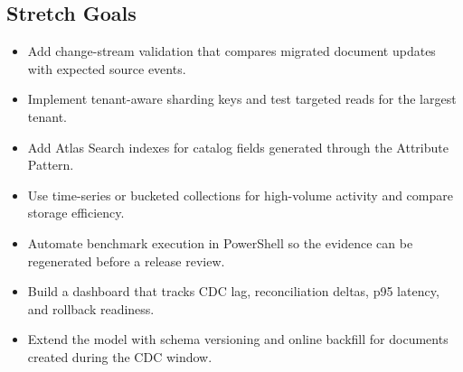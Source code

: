 \subsection*{Stretch Goals}
\begin{itemize}
    \item Add change-stream validation that compares migrated document updates with expected source events.
    \item Implement tenant-aware sharding keys and test targeted reads for the largest tenant.
    \item Add Atlas Search indexes for catalog fields generated through the Attribute Pattern.
    \item Use time-series or bucketed collections for high-volume activity and compare storage efficiency.
    \item Automate benchmark execution in PowerShell so the evidence can be regenerated before a release review.
    \item Build a dashboard that tracks CDC lag, reconciliation deltas, p95 latency, and rollback readiness.
    \item Extend the model with schema versioning and online backfill for documents created during the CDC window.
\end{itemize}

